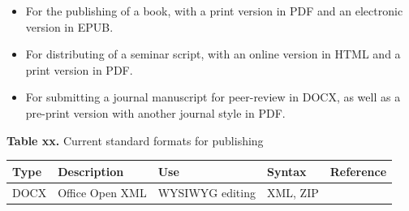 \documentclass[10pt,fleqn]{wlpeerj}
\providecommand{\tightlist}{%
  \setlength{\itemsep}{0pt}\setlength{\parskip}{0pt}}
\begin{document}
\begin{itemize}
\tightlist
\item
  For
  the
  publishing
  of
  a
  book,
  with
  a
  print
  version
  in
  PDF
  and
  an
  electronic
  version
  in
  EPUB.
\item
  For
  distributing
  of
  a
  seminar
  script,
  with
  an
  online
  version
  in
  HTML
  and
  a
  print
  version
  in
  PDF.
\item
  For
  submitting
  a
  journal
  manuscript
  for
  peer-review
  in
  DOCX,
  as
  well
  as
  a
  pre-print
  version
  with
  another
  journal
  style
  in
  PDF.
\end{itemize}

\textbf{Table
xx.}
Current
standard
formats
for
publishing

\begin{longtable}[]{@{}lllll@{}}
\toprule
\begin{minipage}[b]{0.08\columnwidth}\raggedright\strut
\textbf{Type}\strut
\end{minipage}
&
\begin{minipage}[b]{0.21\columnwidth}\raggedright\strut
\textbf{Description}\strut
\end{minipage}
&
\begin{minipage}[b]{0.16\columnwidth}\raggedright\strut
\textbf{Use}\strut
\end{minipage}
&
\begin{minipage}[b]{0.13\columnwidth}\raggedright\strut
\textbf{Syntax}\strut
\end{minipage}
&
\begin{minipage}[b]{0.28\columnwidth}\raggedright\strut
\textbf{Reference}\strut
\end{minipage}\tabularnewline
\midrule
\endhead
\begin{minipage}[t]{0.08\columnwidth}\raggedright\strut
DOCX\strut
\end{minipage}
&
\begin{minipage}[t]{0.21\columnwidth}\raggedright\strut
Office
Open
XML\strut
\end{minipage}
&
\begin{minipage}[t]{0.16\columnwidth}\raggedright\strut
WYSIWYG
editing\strut
\end{minipage}
&
\begin{minipage}[t]{0.13\columnwidth}\raggedright\strut
XML,
ZIP\strut
\end{minipage}
&
\begin{minipage}[t]{0.28\columnwidth}\raggedright\strut

\end{minipage}
\end{longtable}
\end{document}
